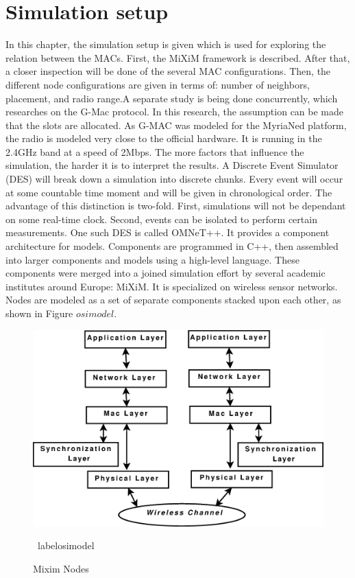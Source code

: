 \documentclass[a4paper,8pt]{report}
\begin{document}
\section{Simulation setup}
In this chapter, the simulation setup is given which is used for
exploring the relation between the MACs. First, the MiXiM framework
is described. After that, a closer inspection will be done of the
several MAC configurations. Then, the different node configurations
are given in terms of: number of neighbors, placement, and radio
range.A separate study is being done concurrently, which researches
on the G-Mac protocol. In this research, the assumption can be made
that the slots are allocated. As G-MAC was modeled for the MyriaNed
platform, the radio is modeled very close to the official hardware.
It is running in the 2.4GHz band at a speed of 2Mbps. The more
factors that influence the simulation, the harder it is to interpret
the results. A Discrete Event Simulator (DES) will break down a
simulation into discrete chunks. Every event will occur at some
countable time moment and will be given in chronological order. The
advantage of this distinction is two-fold. First, simulations will
not be dependant on some real-time clock. Second, events can be
isolated to perform certain measurements.
\newline One such DES is called OMNeT++. It provides a component architecture for models.
Components are programmed in C++, then assembled into larger
components and models using a high-level language. These components
were merged into a joined simulation effort by several academic
institutes around Europe: MiXiM. It is specialized on wireless
sensor networks. Nodes are modeled as a set of separate components
stacked upon each other, as shown in Figure $osimodel$.
\begin{figure}
\centering
\includegraphics[width=1\textwidth]{osimodel}
\caption{Mixim Nodes} \ label{osimodel}
\end{figure}
\end{document}
